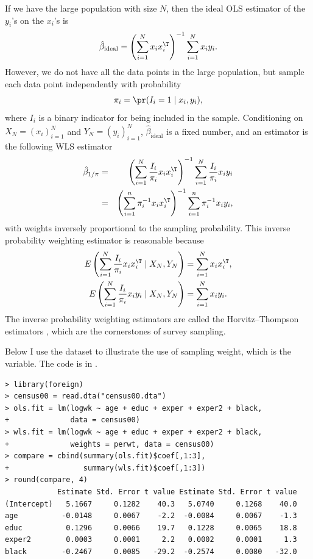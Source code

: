 If we have the large population with size $N$, then the ideal OLS
estimator of the $y_i$'s on the $x_i$'s is
\[
\hat{\beta}_{\text{ideal}}=\left(\sum_{i=1}^{N}x_{i}x_{i}^{\T}\right)^{-1}\sum_{i=1}^{N}x_{i}y_{i}.
\]
However, we do not have all the data points in the large population,
but sample each data point independently with probability
\[
\pi_{i}=\pr(I_{i}=1\mid x_{i},y_{i}),
\]
where $I_{i}$ is a binary indicator for being included in the sample.
Conditioning on $X_N = (x_{i})_{i=1}^N$ and $Y_N = (y_{i})_{i=1}^{N}$, $\hat{\beta}_{\text{ideal}}$ is a fixed number, and an estimator is
the following WLS estimator
\begin{eqnarray*}
\hat{\beta}_{1/\pi} 
&=& \left(\sum_{i=1}^{N}\frac{I_{i}}{\pi_{i}}x_{i}x_{i}^{\T}\right)^{-1}\sum_{i=1}^{N}\frac{I_{i}}{\pi_{i}}x_{i}y_{i}  \\
&=&\left(\sum_{i=1}^{n}\pi_{i}^{-1}x_{i}x_{i}^{\T}\right)^{-1}\sum_{i=1}^{n}\pi_{i}^{-1}x_{i}y_{i},
\end{eqnarray*}
with weights inversely proportional to the sampling probability. This
inverse probability weighting estimator is reasonable because 
\begin{align*}
E\left(\sum_{i=1}^{N}\frac{I_{i}}{\pi_{i}}x_{i}x_{i}^{\T}\mid X_N,Y_N\right) & =\sum_{i=1}^{N}x_{i}x_{i}^{\T},\\
E\left(\sum_{i=1}^{N}\frac{I_{i}}{\pi_{i}}x_{i}y_{i}\mid X_N,Y_N\right) & =\sum_{i=1}^{N}x_{i}y_{i}.
\end{align*}
The inverse probability weighting estimators are called
the Horvitz--Thompson estimators \citep{horvitz1952generalization}, which are the cornerstones of survey sampling. 


Below I use the dataset  to illustrate the use of sampling weight, which is the  variable. The  code is in .

\begin{lstlisting}
> library(foreign)
> census00 = read.dta("census00.dta")
> ols.fit = lm(logwk ~ age + educ + exper + exper2 + black,
+              data = census00)
> wls.fit = lm(logwk ~ age + educ + exper + exper2 + black,
+              weights = perwt, data = census00)
> compare = cbind(summary(ols.fit)$coef[,1:3], 
+                 summary(wls.fit)$coef[,1:3])
> round(compare, 4)
            Estimate Std. Error t value Estimate Std. Error t value
(Intercept)   5.1667     0.1282    40.3   5.0740     0.1268    40.0
age          -0.0148     0.0067    -2.2  -0.0084     0.0067    -1.3
educ          0.1296     0.0066    19.7   0.1228     0.0065    18.8
exper2        0.0003     0.0001     2.2   0.0002     0.0001     1.3
black        -0.2467     0.0085   -29.2  -0.2574     0.0080   -32.0
\end{lstlisting}

